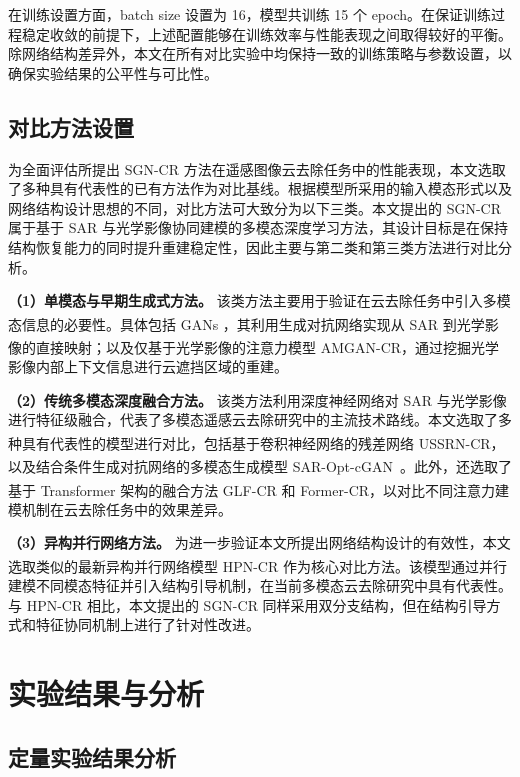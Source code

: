 在训练设置方面，batch size 设置为 16，模型共训练 15 个 epoch。在保证训练过程稳定收敛的前提下，上述配置能够在训练效率与性能表现之间取得较好的平衡。除网络结构差异外，本文在所有对比实验中均保持一致的训练策略与参数设置，以确保实验结果的公平性与可比性。

\subsection{对比方法设置}

为全面评估所提出 SGN-CR 方法在遥感图像云去除任务中的性能表现，本文选取了多种具有代表性的已有方法作为对比基线。根据模型所采用的输入模态形式以及网络结构设计思想的不同，对比方法可大致分为以下三类。本文提出的 SGN-CR 属于基于 SAR 与光学影像协同建模的多模态深度学习方法，其设计目标是在保持结构恢复能力的同时提升重建稳定性，因此主要与第二类和第三类方法进行对比分析。

\textbf{（1）单模态与早期生成式方法。}  
该类方法主要用于验证在云去除任务中引入多模态信息的必要性。具体包括 GANs \textsuperscript{\cite{darbaghshahi2021cloud}}，其利用生成对抗网络实现从 SAR 到光学影像的直接映射；以及仅基于光学影像的注意力模型 AMGAN-CR\textsuperscript{\cite{xu2022attention}}，通过挖掘光学影像内部上下文信息进行云遮挡区域的重建。

\textbf{（2）传统多模态深度融合方法。}  
该类方法利用深度神经网络对 SAR 与光学影像进行特征级融合，代表了多模态遥感云去除研究中的主流技术路线。本文选取了多种具有代表性的模型进行对比，包括基于卷积神经网络的残差网络 USSRN-CR\textsuperscript{\cite{wang2023cloud}}，以及结合条件生成对抗网络的多模态生成模型 SAR-Opt-cGAN~\textsuperscript{\cite{grohnfeldt2018conditional}}。此外，还选取了基于 Transformer 架构的融合方法 GLF-CR\textsuperscript{\cite{xu2022glf}} 和 Former-CR\textsuperscript{\cite{han2023former}}，以对比不同注意力建模机制在云去除任务中的效果差异。

\textbf{（3）异构并行网络方法。}  
为进一步验证本文所提出网络结构设计的有效性，本文选取类似的最新异构并行网络模型 HPN-CR\textsuperscript{\cite{gu2025hpn}} 作为核心对比方法。该模型通过并行建模不同模态特征并引入结构引导机制，在当前多模态云去除研究中具有代表性。与 HPN-CR 相比，本文提出的 SGN-CR 同样采用双分支结构，但在结构引导方式和特征协同机制上进行了针对性改进。

\section{实验结果与分析}

\subsection{定量实验结果分析}

